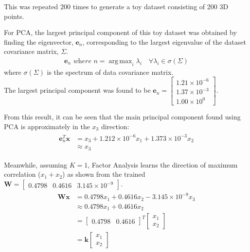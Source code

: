 \documentclass[a4paper,12pt]{article}
\DeclareMathOperator*{\argmax}{arg\,max}
\newcommand{\x}{\mathbf{x}}
\begin{document}
This was repeated 200 times to generate a toy dataset consisting of 200 3D points.

For PCA, the largest principal component of this toy dataset was obtained by finding the eigenvector, $\bm{e}_n$, corresponding to the largest eigenvalue of the dataset covariance matrix, $\Sigma$.
\begin{align}
\bm{e}_n \textit{ where } n = \argmax_i \lambda_i \quad \forall \lambda_i \in \sigma(\Sigma)
\end{align}
where $\sigma(\Sigma)$ is the spectrum of data covariance matrix. \\

The largest principal component was found to be $\bm{e}_n = \begin{bmatrix}
1.21 \times 10^{-6} \\ 1.37 \times 10^{-3} \\ 1.00 \times 10^0
\end{bmatrix}$. 

From this result, it can be seen that the main principal component found using PCA is approximately in the $x_3$ direction:
\begin{align}
\begin{split}
\bm{e}_n^T \x & = x_3 + 1.212 \times 10^{-6} x_1 + 1.373 \times 10^{-3} x_2 \\
& \approx x_3
\end{split}
\end{align}

Meanwhile, assuming $K=1$, Factor Analysis learns the direction of maximum correlation ($x_1 + x_2$) as shown from the trained $\mathbf{W} = \begin{bmatrix}
0.4798 & 0.4616 & 3.145 \times 10^{-9}
\end{bmatrix}$.
\begin{align}
\begin{split}
\mathbf{W} \x & = 0.4798 x_1 + 0.4616 x_2 - 3.145 \times 10^{-9} x_3 \\
& \approx 0.4798 x_1 + 0.4616 x_2 \\
& = \begin{bmatrix}
0.4798 & 0.4616
\end{bmatrix}^T 
\begin{bmatrix}
x_1 \\ x_2
\end{bmatrix} \\
& = \mathbf{k} \begin{bmatrix}
x_1 \\ x_2
\end{bmatrix}
\end{split}
\end{align}
\end{document}
